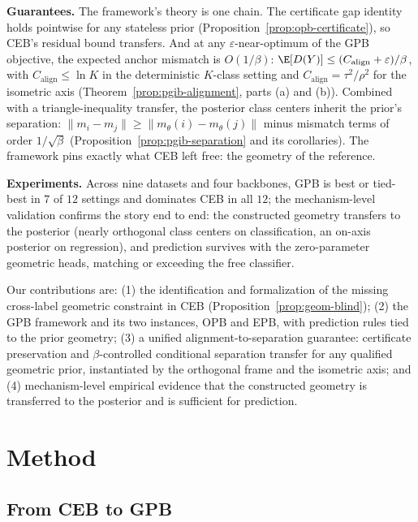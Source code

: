\documentclass{article} %
\theoremstyle{plain}
\theoremstyle{remark}
\begin{document}
\textbf{Guarantees.} The framework's theory is one chain. The certificate gap identity
holds pointwise for any stateless prior (Proposition~\ref{prop:opb-certificate}), so
CEB's residual bound transfers. And at any $\varepsilon$-near-optimum of the GPB
objective, the expected anchor mismatch is $O(1/\beta)$:
$\E[D(Y)] \le (C_{\mathrm{align}}+\varepsilon)/\beta$, with
$C_{\mathrm{align}} \le \ln K$ in the deterministic $K$-class setting and
$C_{\mathrm{align}} = \tau^2/\rho^2$ for the isometric axis
(Theorem~\ref{prop:pgib-alignment}, parts (a) and (b)). Combined with a
triangle-inequality transfer, the posterior class centers inherit the prior's
separation: $\|m_i - m_j\| \ge \|m_\theta(i) - m_\theta(j)\|$ minus mismatch terms
of order $1/\sqrt\beta$ (Proposition~\ref{prop:pgib-separation} and its corollaries).
The framework pins exactly what CEB left free: the geometry of the reference.

\textbf{Experiments.} Across nine datasets and four backbones, GPB is best or
tied-best in $7$ of $12$ settings and dominates CEB in all $12$; the mechanism-level
validation confirms the story end to end: the constructed geometry transfers to the
posterior (nearly orthogonal class centers on classification, an on-axis posterior on
regression), and prediction survives with the zero-parameter geometric heads, matching
or exceeding the free classifier.

Our contributions are: (1) the identification and formalization of the missing
cross-label geometric constraint in CEB (Proposition~\ref{prop:geom-blind});
(2) the GPB framework and its two instances, OPB and EPB, with prediction rules tied
to the prior geometry; (3) a unified alignment-to-separation guarantee: certificate
preservation and $\beta$-controlled conditional separation transfer for any qualified
geometric prior, instantiated by the orthogonal frame and the isometric axis; and
(4) mechanism-level empirical evidence that the constructed geometry is transferred to
the posterior and is sufficient for prediction.

\section{Method}

\subsection{From CEB to GPB}
\label{sec:theory}
\end{document}
